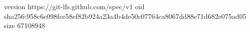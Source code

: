 version https://git-lfs.github.com/spec/v1
oid sha256:958c6c098fce58ef82b924a23a4b4de50c07764ca8067dd88e71d682e075ad05
size 67108948
